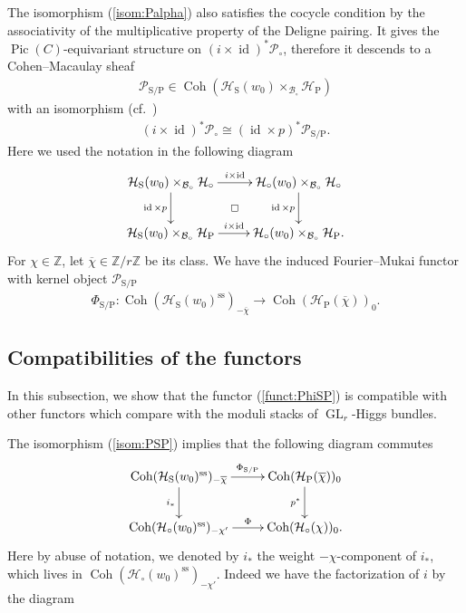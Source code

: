 \documentclass[11pt,oneside,a4paper,mathscr]{amsart}
\makeatletter
\theoremstyle{definition}
\newcommand{\Pic}{\operatorname{Pic}}
\newcommand{\cH}{\mathcal{H}}
\newcommand{\cB}{\mathcal{B}}
\newcommand{\cP}{\mathcal{P}}
\newcommand{\diasquare}{\ar@{}[rd]|\square}
\newcommand{\Coh}{\operatorname{Coh}}
\newcommand{\id}{\operatorname{id}}
\newcommand{\GL}{\operatorname{GL}}
\newcommand{\rS}{\mathrm{S}}
\newcommand{\rP}{\mathrm{P}}
\makeatother
\begin{document}
The isomorphism (\ref{isom:Palpha}) also satisfies the 
cocycle condition by the associativity of the multiplicative property of the Deligne pairing.
It 
gives the $\Pic(C)$-equivariant structure on 
$(i\times \id)^* \cP_{\circ}$, therefore it descends to 
a Cohen--Macaulay sheaf 
\begin{align}\label{AR:SP}
\cP_{\rS/\rP} \in \Coh(\cH_{\rS}(w_0)\times_{\cB_{\circ}}\cH_{\rP})
\end{align}
with an isomorphism (cf.~\cite[Proposition~4.4]{GS})
\begin{align}\label{isom:PSP}
    (i\times \id)^* \cP_{\circ}\cong (\id\times p)^* \cP_{\rS/\rP}.
\end{align}
Here we used the notation in the following diagram 
\begin{align}\label{dia:SP}
    \xymatrix{
    \cH_{\rS}(w_0)\times_{\cB_{\circ}}\cH_{\circ} \ar[r]^-{i\times \id} 
    \ar[d]_-{\id \times p} \diasquare & \cH_{\circ}(w_0)\times_{\cB_{\circ}}\cH_{\circ} \ar[d]_-{\id \times p}  \\
    \cH_{\rS}(w_0)\times_{\cB_{\circ}}\cH_{\rP} \ar[r]^-{i\times \id}  & \cH_{\circ}(w_0)\times_{\cB_{\circ}}\cH_{\rP}.
    }
\end{align}
For $\chi \in \mathbb{Z}$, let $\overline{\chi}\in \mathbb{Z}/r\mathbb{Z}$ be its class. 
We have the induced Fourier--Mukai functor with kernel object $\cP_{\mathrm{S}/\mathrm{P}}$
\begin{align}\label{funct:PhiSP}
    \Phi_{\rS/\rP} \colon \Coh(\cH_{\rS}(w_0)^{\mathrm{ss}})_{-\overline{\chi}} \to 
    \Coh(\cH_{\rP}(\overline{\chi}))_0.
\end{align}

\subsection{Compatibilities of the functors}
In this subsection, we show that the functor (\ref{funct:PhiSP}) 
is compatible with other functors which compare with the moduli 
stacks of $\GL_r$-Higgs bundles. 

The isomorphism (\ref{isom:PSP}) implies that the following diagram commutes 
\begin{align}\label{commute:Phi}
    \xymatrix{
\Coh(\cH_{\rS}(w_0)^{\mathrm{ss}})_{-\overline{\chi}} \ar[r]^-{\Phi_{\rS/\rP}} \ar[d]_-{i_{*}} & \Coh(\cH_{\rP}(\overline{\chi}))_0 \ar[d]_-{p^*} \\
\Coh(\cH_{\circ}(w_0)^{\mathrm{ss}})_{-\chi'} \ar[r]^-{\Phi} & \Coh(\cH_{\circ}(\chi))_0.
    }
\end{align}
Here by abuse of notation, we denoted by $i_{*}$ the weight $-\chi$-component of $i_{*}$, 
which lives in $\Coh(\cH_{\circ}(w_0)^{\mathrm{ss}})_{-\chi'}$. 
Indeed we have the factorization of $i$ by the diagram 
\end{document}

